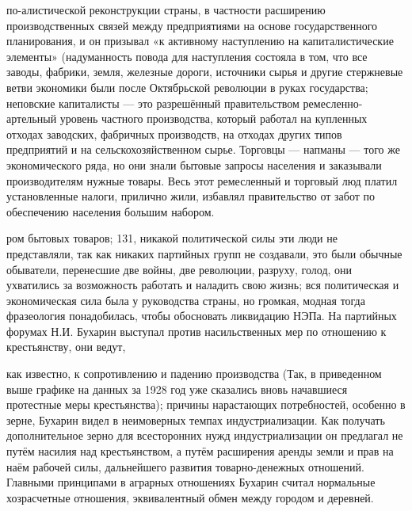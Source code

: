 по-алистической реконструкции страны, в частности расширению производственных связей между предприятиями на основе государственного планирования, и он призывал «к активному наступлению на капиталистические элементы» (надуманность повода для наступления состояла в том, что все заводы, фабрики, земля, железные дороги, источники сырья и другие стержневые ветви экономики были после Октябрьской революции в руках государства; неповские капиталисты — это разрешённый правительством ремесленно-артельный уровень частного производства, который работал на купленных отходах заводских, фабричных производств, на отходах других типов предприятий и на сельскохозяйственном сырье. Торговцы — напманы — того же экономического ряда, но они знали бытовые запросы населения и заказывали производителям нужные товары. Весь этот ремесленный и торговый люд платил установленные налоги, прилично жили, избавлял правительство от забот по обеспечению населения большим набором.

ром бытовых товаров; 131, никакой политической силы эти люди не представляли, так как никаких партийных групп не создавали, это были обычные обыватели, перенесшие две войны, две революции, разруху, голод, они ухватились за возможность работать и наладить свою жизнь; вся политическая и экономическая сила была у руководства страны, но громкая, модная тогда фразеология понадобилась, чтобы обосновать ликвидацию НЭПа. На партийных форумах Н.И. Бухарин выступал против насильственных мер по отношению к крестьянству, они ведут,

как известно, к сопротивлению и падению производства (Так, в приведенном выше графике на данных за 1928 год уже сказались вновь начавшиеся протестные меры крестьянства); причины нарастающих потребностей, особенно в зерне, Бухарин видел в неимоверных темпах индустриализации. Как получать дополнительное зерно для всесторонних нужд индустриализации он предлагал не путём насилия над крестьянством, а путём расширения аренды земли и прав на наём рабочей силы, дальнейшего развития товарно-денежных отношений. Главными принципами в аграрных отношениях Бухарин считал нормальные хозрасчетные отношения, эквивалентный обмен между городом и деревней.

